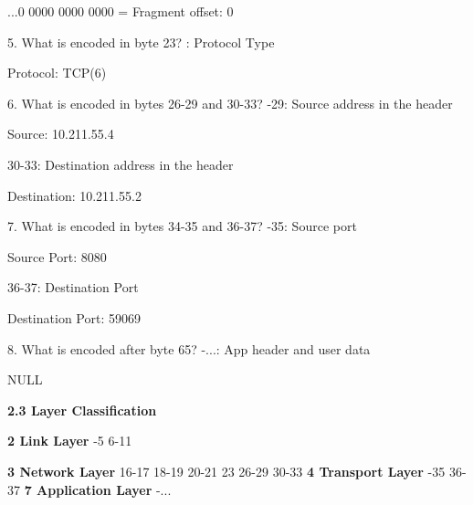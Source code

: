 \documentclass{article}%
\newenvironment{code}%
   {\snugshade\verbatim}%
   {\endverbatim\endsnugshade}
\begin{document}
\begin{Large}
\begin{code}
    ...0 0000 0000 0000 = Fragment offset: 0
\end{code}
\begin{flushleft}
5. What is encoded in byte 23?
: Protocol Type
\end{flushleft}
\begin{code}
    Protocol: TCP(6)
\end{code}
\newpage
\begin{flushleft}
6. What is encoded in bytes 26-29 and 30-33?
-29: Source address in the header
\end{flushleft}
\begin{code}
    Source: 10.211.55.4
\end{code}

\begin{flushleft}
30-33: Destination address in the header
\end{flushleft}
\begin{code}
    Destination: 10.211.55.2
\end{code}
\begin{flushleft}
7. What is encoded in bytes 34-35 and 36-37?
-35: Source port
\end{flushleft}
\begin{code}
    Source Port: 8080
\end{code}
\begin{flushleft}
36-37: Destination Port
\end{flushleft}
\begin{code}
    Destination Port: 59069
\end{code}
\begin{flushleft}
8. What is encoded after byte 65?
-...: App header and user data
\end{flushleft}
\begin{code}
    NULL
\end{code}

\begin{LARGE}
\begin{flushleft}
\textbf{2.3 Layer Classification}
\end{flushleft}
\end{LARGE}
\begin{flushleft}
\textbf{2 Link Layer}
\begin{code}
    0-5
    6-11 
\end{code}

\textbf{3 Network Layer}
\begin{code}
    14
    16-17
    18-19
    20-21
    23
    26-29
    30-33
\end{code}
\newpage
\textbf{4 Transport Layer}
\begin{code}
    34-35
    36-37
\end{code}
\textbf{7 Application Layer}
\begin{code}
    66-...
\end{code}
\end{flushleft}

\end{Large}
\end{document}
